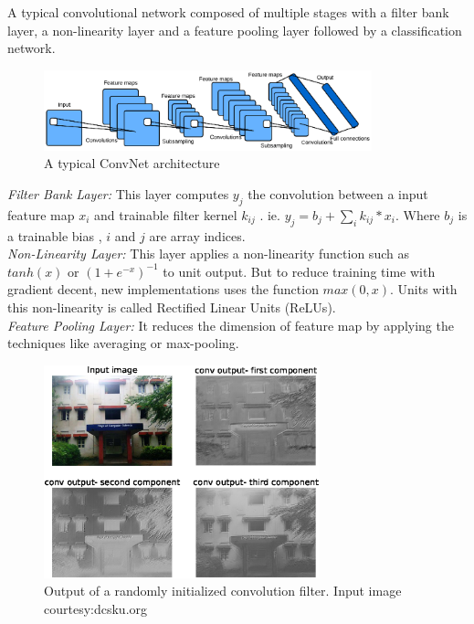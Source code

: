 \documentclass{article}
\begin{document}
\par
A typical convolutional  network composed of multiple stages with a filter bank layer, a non-linearity layer and a feature pooling layer \cite{lecun2010convolutional} followed by a classification network.\\
\begin{figure}[ht]
 \includegraphics[width=9.5cm]{Figures/convent.eps}
\caption{A typical ConvNet architecture \cite{lecun2010convolutional}}
\label{net}
\end{figure}
\emph{Filter Bank Layer:} This layer computes $y_{j}$ the convolution between a input feature map   $x_i$ and trainable filter kernel $k_{ij}$ 
. ie. $y_j=b_j+\sum_i {k_{ij}*x_i}$. Where $b_j$ is a trainable bias , $i$ and $j$ are  array indices.\\
\emph{Non-Linearity Layer:} This layer applies a non-linearity function such as $tanh(x)$ or $(1+e^{-x})^{-1}$ to unit output. But to reduce training time with gradient decent, new implementations uses the function $max(0,x)$. Units with this non-linearity is called Rectified Linear Units (ReLUs)\cite{Nair2010}.\\
\emph{Feature Pooling Layer:} It  reduces the dimension of  feature map by applying the techniques like averaging or max-pooling.
\begin{figure}[ht]
 \centering
 \includegraphics[width=8cm]{Figures/conv.eps}
\caption{Output of  a randomly initialized   convolution filter. Input image courtesy:dcsku.org}
\label{conv}
\end{figure}

\end{document}
